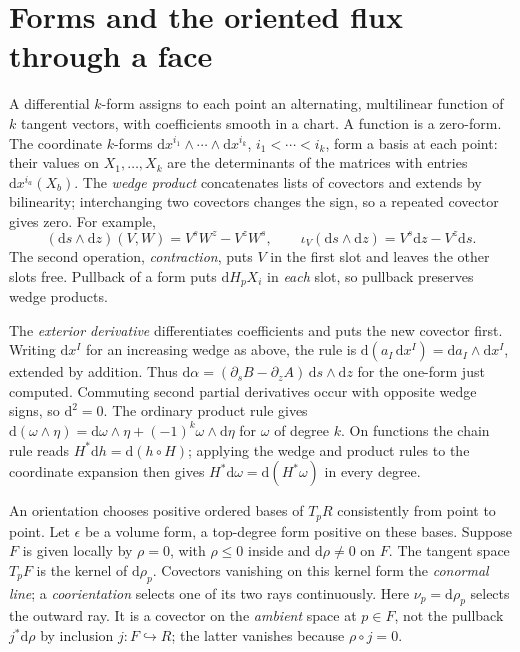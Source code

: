 \section{Forms and the oriented flux through a face}\label{D-forms-flux}

A differential $k$-form assigns to each point an alternating, multilinear function of $k$ tangent vectors, with coefficients smooth in a chart. A function is a zero-form. The coordinate $k$-forms $\mathrm{d}x^{i_1}\wedge\cdots\wedge\mathrm{d}x^{i_k}$, $i_1<\cdots<i_k$, form a basis at each point: their values on $X_1,\ldots,X_k$ are the determinants of the matrices with entries $\mathrm{d}x^{i_a}(X_b)$. The \emph{wedge product} concatenates lists of covectors and extends by bilinearity; interchanging two covectors changes the sign, so a repeated covector gives zero. For example,
\[
 (\mathrm{d}s\wedge\mathrm{d}z)(V,W)=V^s W^z-V^z W^s,
 \qquad \iota_V(\mathrm{d}s\wedge\mathrm{d}z)=V^s\mathrm{d}z-V^z\mathrm{d}s .
\]
The second operation, \emph{contraction}, puts $V$ in the first slot and leaves the other slots free. Pullback of a form puts $\mathrm{d}H_p X_i$ in \emph{each} slot, so pullback preserves wedge products.

The \emph{exterior derivative} differentiates coefficients and puts the new covector first. Writing $\mathrm{d}x^I$ for an increasing wedge as above, the rule is $\mathrm{d}(a_I\,\mathrm{d}x^I)=\mathrm{d}a_I\wedge\mathrm{d}x^I$, extended by addition. Thus $\mathrm{d}\alpha=(\partial_s B-\partial_z A)\,\mathrm{d}s\wedge\mathrm{d}z$ for the one-form just computed. Commuting second partial derivatives occur with opposite wedge signs, so $\mathrm{d}^2=0$. The ordinary product rule gives $\mathrm{d}(\omega\wedge\eta)=\mathrm{d}\omega\wedge\eta + {(-1)}^k\omega\wedge\mathrm{d}\eta$ for $\omega$ of degree $k$. On functions the chain rule reads $H^*\mathrm{d}h=\mathrm{d}(h\circ H)$; applying the wedge and product rules to the coordinate expansion then gives $H^*\mathrm{d}\omega=\mathrm{d}(H^*\omega)$ in every degree.

An orientation chooses positive ordered bases of $T_p R$ consistently from point to point. Let $\epsilon$ be a volume form, a top-degree form positive on these bases. Suppose $F$ is given locally by $\rho=0$, with $\rho\leq0$ inside and $\mathrm{d}\rho\ne0$ on $F$. The tangent space $T_p F$ is the kernel of $\mathrm{d}\rho_p$. Covectors vanishing on this kernel form the \emph{conormal line}; a \emph{coorientation} selects one of its two rays continuously. Here $\nu_p=\mathrm{d}\rho_p$ selects the outward ray. It is a covector on the \emph{ambient} space at $p\in F$, not the pullback $j^*\mathrm{d}\rho$ by inclusion $j:F\hookrightarrow R$; the latter vanishes because $\rho\circ j=0$.

